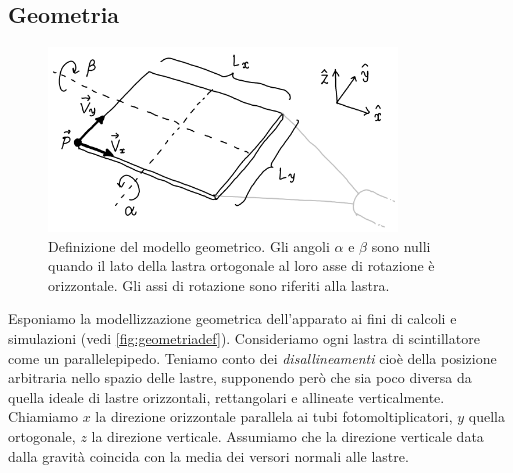 \subsection{Geometria}

\begin{figure}
	\center
	\includegraphics[width=25em]{geometriadef}
	\caption{\label{fig:geometriadef}
	Definizione del modello geometrico.
	Gli angoli $\alpha$ e $\beta$ sono nulli
	quando il lato della lastra ortogonale al loro asse di rotazione è orizzontale.
	Gli assi di rotazione sono riferiti alla lastra.}
\end{figure}

Esponiamo la modellizzazione geometrica dell'apparato ai fini di calcoli e simulazioni
(vedi \autoref{fig:geometriadef}).
Consideriamo ogni lastra di scintillatore come un parallelepipedo.
Teniamo conto dei \emph{disallineamenti} cioè della posizione arbitraria nello spazio delle lastre,
supponendo però che sia poco diversa da quella ideale di lastre orizzontali, rettangolari e allineate verticalmente.
Chiamiamo $x$ la direzione orizzontale parallela ai tubi fotomoltiplicatori,
$y$ quella ortogonale,
$z$ la direzione verticale.
Assumiamo che la direzione verticale data dalla gravità
coincida con la media dei versori normali alle lastre.
